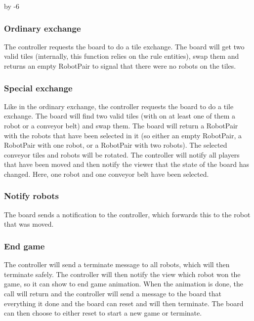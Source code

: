 	


	\advance{} by -6

	\subsubsection{Ordinary exchange}
	The controller requests the board to do a tile exchange. The board will get two valid tiles (internally, this function relies on the rule entities), swap them and returns an empty RobotPair to signal that there were no robots on the tiles.

	

	\subsubsection{Special exchange}
	Like in the ordinary exchange, the controller requests the board to do a tile exchange. The board will find two valid tiles (with on at least one of them a robot or a conveyor belt) and swap them. The board will return a RobotPair with the robots that have been selected in it (so either an empty RobotPair, a RobotPair with one robot, or a RobotPair with two robots). The selected conveyor tiles and robots will be rotated. The controller will notify all players that have been moved and then notify the viewer that the state of the board has changed. Here, one robot and one conveyor belt have been selected.

	
	
	\subsubsection{Notify robots}
	The board sends a notification to the controller, which forwards this to the robot that was moved.	

	

	\subsubsection{End game}
	The controller will send a terminate message to all robots, which will then terminate safely. The controller will then notify the view which robot won the game, so it can show to end game animation. When the animation is done, the call will return and the controller will send a message to the board that everything it done and the board can reset and will then terminate. The board can then choose to either reset to start a new game or terminate.

	
